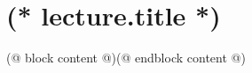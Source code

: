\documentclass[12pt, twoside]{dgs}
\numberwithin{equation}{subsection}
\numberwithin{figure}{subsection}
\begin{document}
    \pagestyle{scholar}
    \section{(* lecture.title *)}
    
    (@ block content @)(@ endblock content @)
\end{document}
